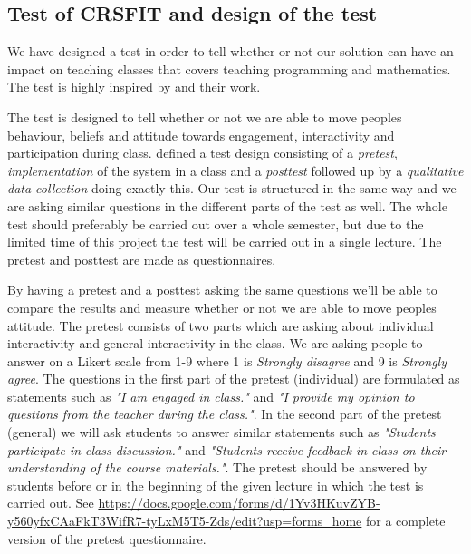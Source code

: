 \subsection{Test of CRSFIT and design of the test}
We have designed a test in order to tell whether or not our solution can have an impact on teaching classes that covers teaching programming and mathematics. The test is highly inspired by \cite{siau2006use} and their work.

The test is designed to tell whether or not we are able to move peoples behaviour, beliefs and attitude towards engagement, interactivity and participation during class.  defined a test design consisting of a \emph{pretest}, \emph{implementation} of the system in a class and a \emph{posttest} followed up by a \emph{qualitative data collection} doing exactly this. Our test is structured in the same way and we are asking similar questions in the different parts of the test as well. The whole test should preferably be carried out over a whole semester, but due to the limited time of this project the test will be carried out in a single lecture. The pretest and posttest are made as questionnaires. 

By having a pretest and a posttest asking the same questions we'll be able to compare the results and measure whether or not we are able to move peoples attitude. The pretest consists of two parts which are asking about individual interactivity and general interactivity in the class. We are asking people to answer on a Likert scale from  1-9 where 1 is \emph{Strongly disagree} and 9 is \emph{Strongly agree}. The questions in the first part of the pretest (individual) are formulated as statements such as \emph{"I am engaged in class."} and \emph{"I provide my opinion to questions from the teacher during the class."}. In the second part of the pretest (general) we will ask students to answer similar statements such as \emph{"Students participate in class discussion."} and \emph{"Students receive feedback in class on their understanding of the course materials."}. The pretest should be answered by students before or in the beginning of the given lecture in which the test is carried out. See \url{https://docs.google.com/forms/d/1Yv3HKuvZYB-y560yfxCAaFkT3WifR7-tyLxM5T5-Zds/edit?usp=forms_home} for a complete version of the pretest questionnaire.

